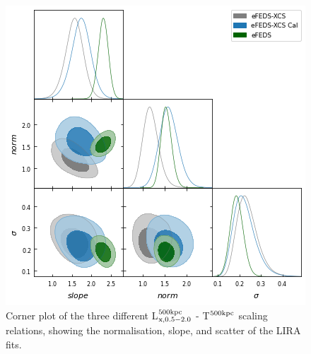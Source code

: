 \documentclass[fleqn,usenatbib]{mnras}
\begin{document}
\begin{figure}
    \centering
    \includegraphics[width=0.95\columnwidth]{images/lt52_corner.png}
    \caption[]{Corner plot of the three different L$^{500\rm{kpc}}_{\rm{x, 0.5-2.0}}$ - T$^{500\rm{kpc}}$ scaling relations, showing the normalisation, slope, and scatter of the LIRA fits.}
    \label{fig:ltcorner}
\end{figure}


\end{document}

